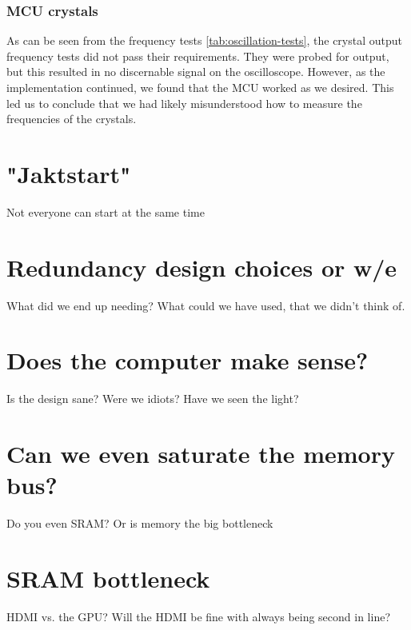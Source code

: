 \documentclass[../main/report.tex]{subfiles}
\begin{document}
\subsubsection*{MCU crystals}
As can be seen from the frequency tests \ref{tab:oscillation-tests}, the crystal output frequency tests did not pass their requirements.
They were probed for output, but this resulted in no discernable signal on the oscilloscope.
However, as the implementation continued, we found that the MCU worked as we desired.
This led us to conclude that we had likely misunderstood how to measure the frequencies of the crystals.







\section{"Jaktstart"}

Not everyone can start at the same time

\section{Redundancy design choices or w/e}
What did we end up needing?
What could we have used, that we didn't think of.

\section{Does the computer make sense?}
Is the design sane?
Were we idiots?
Have we seen the light?

\section{Can we even saturate the memory bus?}
Do you even SRAM?
Or is memory the big bottleneck

\section{SRAM bottleneck}
HDMI vs. the GPU?
Will the HDMI be fine with always being second in line?




\end{document}
